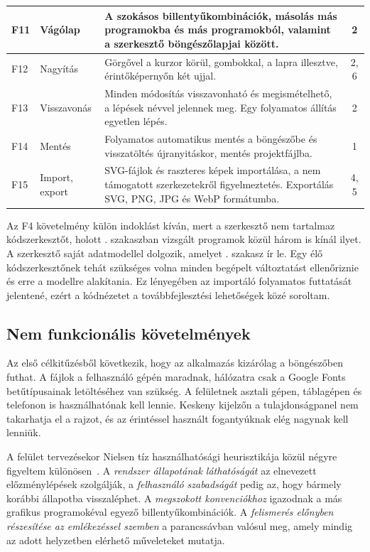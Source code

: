 \begin{table}[!htbp]
\begin{tabular}{|l|>{\raggedright\arraybackslash}p{}|>{\raggedright\arraybackslash}p{}|c|}
F11 & Vágólap & A szokásos billentyűkombinációk, másolás más programokba és más programokból, valamint a szerkesztő böngészőlapjai között. & 2 \\ \hline
F12 & Nagyítás & Görgővel a kurzor körül, gombokkal, a lapra illesztve, érintőképernyőn két ujjal. & 2, 6 \\ \hline
F13 & Visszavonás & Minden módosítás visszavonható és megismételhető, a lépések névvel jelennek meg. Egy folyamatos állítás egyetlen lépés. & 2 \\ \hline
F14 & Mentés & Folyamatos automatikus mentés a böngészőbe és visszatöltés újranyitáskor, mentés projektfájlba. & 1 \\ \hline
F15 & Import, export & SVG-fájlok és raszteres képek importálása, a nem támogatott szerkezetekről figyelmeztetés. Exportálás SVG, PNG, JPG és WebP formátumba. & 4, 5 \\ \hline
\end{tabular}
\end{table}

Az F4 követelmény külön indoklást kíván, mert a szerkesztő nem tartalmaz kódszerkesztőt, holott . szakaszban vizsgált programok közül három is kínál ilyet. A szerkesztő saját adatmodellel dolgozik, amelyet . szakasz ír le. Egy élő kódszerkesztőnek tehát szükséges volna minden begépelt változtatást ellenőriznie és erre a modellre alakítania. Ez lényegében az importáló folyamatos futtatását jelentené, ezért a kódnézetet a továbbfejlesztési lehetőségek közé soroltam.

\subsection{Nem funkcionális követelmények}

Az első célkitűzésből következik, hogy az alkalmazás kizárólag a böngészőben futhat. A fájlok a felhasználó gépén maradnak, hálózatra csak a Google Fonts betűtípusainak letöltéséhez van szükség. A felületnek asztali gépen, táblagépen és telefonon is használhatónak kell lennie. Keskeny kijelzőn a tulajdonságpanel nem takarhatja el a rajzot, és az érintéssel használt fogantyúknak elég nagynak kell lenniük.

A felület tervezésekor Nielsen tíz használhatósági heurisztikája közül négyre figyeltem különösen~\cite{nielsen-heuristics}. A \textit{rendszer állapotának láthatóságát} az elnevezett előzménylépések szolgálják, a \textit{felhasználó szabadságát} pedig az, hogy bármely korábbi állapotba visszaléphet. A \textit{megszokott konvenciókhoz} igazodnak a más grafikus programokéval egyező billentyűkombinációk. A \textit{felismerés előnyben részesítése az emlékezéssel szemben} a parancssávban valósul meg, amely mindig az adott helyzetben elérhető műveleteket mutatja.


